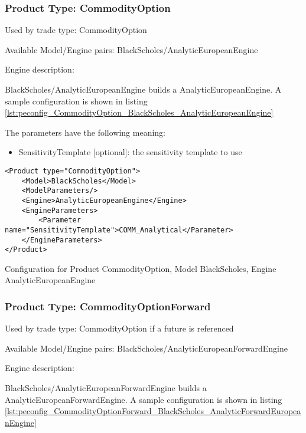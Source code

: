 \subsubsection{Product Type: CommodityOption}

Used by trade type: CommodityOption

Available Model/Engine pairs: BlackScholes/AnalyticEuropeanEngine

Engine description:

BlackScholes/AnalyticEuropeanEngine builds a AnalyticEuropeanEngine. A sample configuration is shown in listing
\ref{lst:peconfig_CommodityOption_BlackScholes_AnalyticEuropeanEngine}

The parameters have the following meaning:

\begin{itemize}
\item SensitivityTemplate [optional]: the sensitivity template to use 
\end{itemize}

\begin{longlisting}
\begin{verbatim}
<Product type="CommodityOption">
    <Model>BlackScholes</Model>
    <ModelParameters/>
    <Engine>AnalyticEuropeanEngine</Engine>
    <EngineParameters>
        <Parameter name="SensitivityTemplate">COMM_Analytical</Parameter>
    </EngineParameters>
</Product>
\end{verbatim}
\caption{Configuration for Product CommodityOption, Model BlackScholes, Engine AnalyticEuropeanEngine}
\label{lst:peconfig_CommodityOption_BlackScholes_AnalyticEuropeanEngine}
\end{longlisting}

\subsubsection{Product Type: CommodityOptionForward}

Used by trade type: CommodityOption if a future is referenced

Available Model/Engine pairs: BlackScholes/AnalyticEuropeanForwardEngine

Engine description:

BlackScholes/AnalyticEuropeanForwardEngine builds a AnalyticEuropeanForwardEngine. A sample configuration is shown in listing
\ref{lst:peconfig_CommodityOptionForward_BlackScholes_AnalyticForwardEuropeanEngine}


